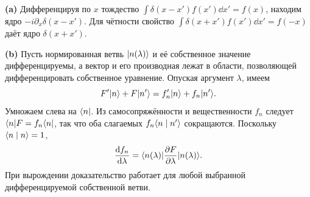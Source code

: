 \documentclass[11pt,a4paper]{article}
\begin{document}
\textbf{(a)} Дифференцируя по \(x\) тождество
\(\int\delta(x-x') f(x')\dd x'=f(x)\), находим ядро
\(-i\partial_x\delta(x-x')\). Для чётности свойство
\(\int\delta(x+x')f(x')\dd x'=f(-x)\) даёт ядро \(\delta(x+x')\).

\textbf{(b)} Пусть нормированная ветвь \(\lvert n(\lambda)\rangle\) и её
собственное значение дифференцируемы, а вектор и его производная
лежат в области, позволяющей дифференцировать собственное уравнение.
Опуская аргумент \(\lambda\), имеем
\[
 F'\lvert n\rangle+F\lvert n'\rangle=f'_n\lvert n\rangle+f_n\lvert n'\rangle.
\]
Умножаем слева на \(\langle n\rvert\). Из самосопряжённости и вещественности
\(f_n\) следует \(\langle n\rvert F=f_n\langle n\rvert\), так что оба слагаемых
\(f_n\langle n\mid n'\rangle\) сокращаются. Поскольку \(\langle n\mid n\rangle=1\),
\[
 \frac{\mathop{}\!\mathrm{d} f_n}{\mathop{}\!\mathrm{d}\lambda}
 =\langle n(\lambda)\rvert\frac{\partial F}{\partial\lambda}\lvert n(\lambda)\rangle.
\]
При вырождении доказательство работает для любой выбранной
дифференцируемой собственной ветви.
\end{document}
